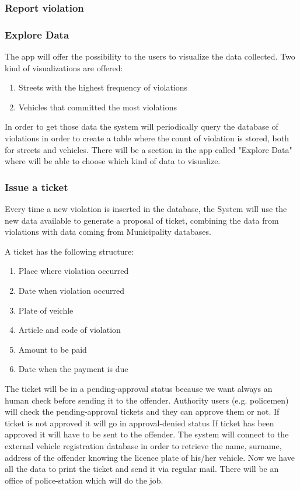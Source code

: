 \subsubsection{Report violation}

\subsubsection{Explore Data}
The app will offer the possibility to the users to visualize the data collected.
Two kind of visualizations are offered:
\begin{enumerate}
  \item Streets with the highest frequency of violations
  \item Vehicles that committed the most violations
\end{enumerate}
In order to get those data the system will periodically query the database of violations in order to create a table where the count of violation is stored, both for streets and vehicles.
There will be a section in the app called "Explore Data" where will be able to choose which kind of data to visualize.

\subsubsection{Issue a ticket}
Every time a new violation is inserted in the database, the System will use the new data available to generate a proposal of ticket, combining the data from violations with data coming from Municipality databases.

A ticket has the following structure:
\begin{enumerate}
  \item Place where violation occurred
  \item Date when violation occurred
  \item Plate of veichle
  \item Article and code of violation
  \item Amount to be paid
  \item Date when the payment is due
\end{enumerate}

The ticket will be in a pending-approval status because we want always an human check before sending it to the offender.
Authority users (e.g. policemen) will check the pending-approval tickets and they can approve them or not.
If ticket is not approved it will go in approval-denied status
If ticket has been approved it will have to be sent to the offender.
The system will connect to the external vehicle registration database in order to retrieve the name, surname, address of the offender knowing the licence plate of his/her vehicle.
Now we have all the data to print the ticket and send it via regular mail. There will be an office of police-station which will do the job.

